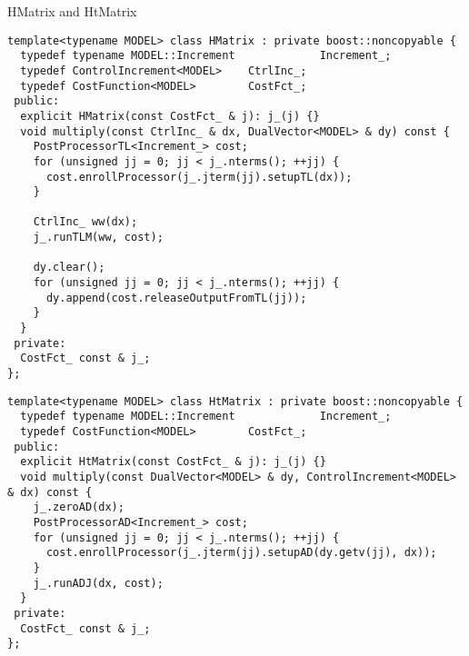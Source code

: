 \documentclass[9pt]{beamer}
\begin{document}
\begin{frame}[fragile]{HMatrix and HtMatrix}
\begin{lstlisting}[basicstyle=\ttfamily\tiny]
template<typename MODEL> class HMatrix : private boost::noncopyable {
  typedef typename MODEL::Increment             Increment_;
  typedef ControlIncrement<MODEL>    CtrlInc_;
  typedef CostFunction<MODEL>        CostFct_;
 public:
  explicit HMatrix(const CostFct_ & j): j_(j) {}
  void multiply(const CtrlInc_ & dx, DualVector<MODEL> & dy) const {
    PostProcessorTL<Increment_> cost;
    for (unsigned jj = 0; jj < j_.nterms(); ++jj) {
      cost.enrollProcessor(j_.jterm(jj).setupTL(dx));
    }

    CtrlInc_ ww(dx);
    j_.runTLM(ww, cost);

    dy.clear();
    for (unsigned jj = 0; jj < j_.nterms(); ++jj) {
      dy.append(cost.releaseOutputFromTL(jj));
    }
  }
 private:
  CostFct_ const & j_;
};
\end{lstlisting}
\begin{lstlisting}[basicstyle=\ttfamily\tiny]
template<typename MODEL> class HtMatrix : private boost::noncopyable {
  typedef typename MODEL::Increment             Increment_;
  typedef CostFunction<MODEL>        CostFct_;
 public:
  explicit HtMatrix(const CostFct_ & j): j_(j) {}
  void multiply(const DualVector<MODEL> & dy, ControlIncrement<MODEL> & dx) const {
    j_.zeroAD(dx);
    PostProcessorAD<Increment_> cost;
    for (unsigned jj = 0; jj < j_.nterms(); ++jj) {
      cost.enrollProcessor(j_.jterm(jj).setupAD(dy.getv(jj), dx));
    }
    j_.runADJ(dx, cost);
  }
 private:
  CostFct_ const & j_;
};
\end{lstlisting}
\end{frame}
\end{document}
